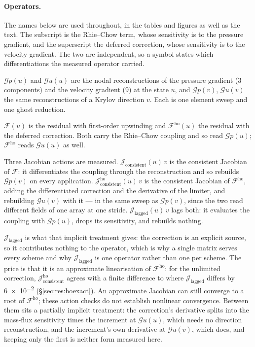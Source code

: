 \documentclass[sigconf,nonacm]{acmart}
\newcommand{\Gop}{\mathcal{G}}
\newcommand{\Fres}{\mathcal{F}}
\newcommand{\Fho}{\mathcal{F}^{\mathrm{ho}}}
\newcommand{\Jlag}{\mathcal{J}_{\mathrm{lagged}}}
\newcommand{\Jex}{\mathcal{J}_{\mathrm{consistent}}}
\newcommand{\Jhoex}{\mathcal{J}^{\mathrm{ho}}_{\mathrm{consistent}}}
\begin{document}
\paragraph{Operators.} The names below are used throughout, in the tables and figures as well as
the text. The subscript is the Rhie--Chow term, whose sensitivity is to the pressure gradient,
and the superscript the deferred correction, whose sensitivity is to the velocity gradient. The
two are independent, so a symbol states which differentiations the measured operator carried.

$\Gop p(u)$ and $\Gop u(u)$ are the nodal reconstructions of the pressure gradient (3
components) and the velocity gradient (9) at the state $u$, and $\Gop p(v)$, $\Gop u(v)$ the
same reconstructions of a Krylov direction $v$. Each is one element sweep and one ghost
reduction.

$\Fres(u)$ is the residual with first-order upwinding and $\Fho(u)$ the residual with the
deferred correction. Both carry the Rhie--Chow coupling and so read $\Gop p(u)$; $\Fho$ reads
$\Gop u(u)$ as well.

Three Jacobian actions are measured. $\Jex(u)\,v$ is
the consistent Jacobian of $\Fres$: it differentiates the coupling through the reconstruction and so
rebuilds $\Gop p(v)$ on every application. $\Jhoex(u)\,v$ is the consistent Jacobian of $\Fho$, adding
the differentiated correction and the derivative of the limiter, and rebuilding $\Gop u(v)$ with
it --- in the same sweep as $\Gop p(v)$, since the two read different fields of one array at one
stride. $\Jlag(u)\,v$ lags both: it evaluates the coupling with $\Gop p(u)$, drops its
sensitivity, and rebuilds nothing.

$\Jlag$ is what that implicit treatment gives: the correction is an explicit source, so it
contributes nothing to the operator, which is why a single matrix serves every scheme and why
$\Jlag$ is one operator rather than one per scheme. The price is that it is an
approximate linearisation of $\Fho$: for the unlimited correction, $\Jhoex$ agrees with a
finite difference to \hoxFdUnlim{} where $\Jlag$ differs by \num{6e-2}
(\S\ref{sec:res:hoexact}). An approximate Jacobian can still converge to a root of $\Fho$;
these action checks do not establish nonlinear convergence. Between them sits a partially
implicit treatment: the correction's derivative splits into the mass-flux sensitivity times the
increment at $\Gop u(u)$, which needs no direction reconstruction, and the increment's own
derivative at $\Gop u(v)$, which does, and keeping only the first is neither form measured here.
\end{document}
